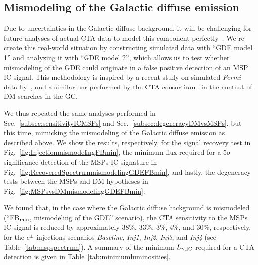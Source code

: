 \documentclass[doublespace,draft,nopageskip]{VTthesis} %
\begin{document}
\subsection{Mismodeling of the Galactic diffuse emission}
\label{subsec:GDEmismodeling}

Due to uncertainties in the Galactic diffuse background, it will be challenging for future analyses of actual CTA data to model this component perfectly~\citep{Acharyya:2020sbj}. 
%
We re-create this  
real-world situation
by constructing simulated data with ``GDE model 1'' and analyzing it with ``GDE model 2'', which allows us to test whether mismodeling of the GDE could originate in a false positive detection of an MSP IC signal. This methodology is inspired by a recent study on simulated {\it Fermi} data by~\citep{Chang:2019ars}, and a similar one performed by the CTA consortium~\citep{Acharyya:2020sbj} in the context of DM searches in the GC. 

We thus repeated the same analyses performed in Sec.~\ref{subsec:sensitivityICMSPs} and Sec.~\ref{subsec:degeneracyDMvsMSPs}, but this time, mimicking the mismodeling of the Galactic diffuse emission as described above. We show the results, respectively, for the signal recovery test in Fig.~\ref{fig:InjectionmismodelingFBmin}, the minimum flux required for a $5\sigma$ significance detection of the MSPs IC signature in Fig.~\ref{fig:RecoveredSpectrummismodelingGDEFBmin}, and lastly, the degeneracy tests between the MSPs and DM hypotheses in Fig.~\ref{fig:MSPsvsDMmismodelingGDEFBmin}. 

We found that, in the case where the Galactic diffuse background is mismodeled (``FB$_{\rm min}$, mismodeling of the GDE'' scenario), the CTA sensitivity to the MSPs IC signal is reduced   by approximately 38\%, 33\%, 3\%, 4\%, and 30\%, respectively, for the $e^\pm$ injections scenarios  \textit{Baseline}, \textit{Inj1}, \textit{Inj2}, \textit{Inj3}, and \textit{Inj4} (see Table~\ref{tab:mspspectrum}). A summary of the minimum $L_{\gamma, {\rm IC}}$ required for a CTA detection is given in Table~\ref{tab:minimumluminosities}.
\end{document}
